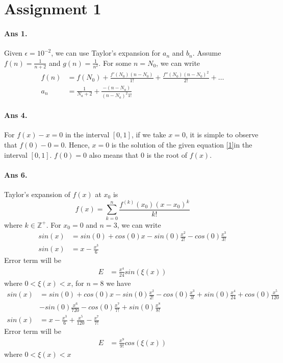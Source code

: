 \documentclass[12pt]{report}
\title{
\author{Devansh Tripathi\\ IMS22090\\ Lecturer: Dr. Asha K. Dond}
}
\begin{document}
\maketitle
\section*{Assignment 1}
\paragraph*{Ans 1.} Given $\epsilon = 10^{-2}$, we can use Taylor's expansion for $a_n$ and $b_n$. Assume $f(n) = \frac{1}{n+2}$ and $g(n) = \frac{1}{n^2}$. For some $n = N_0$, we can write
\begin{align*}
    f(n) &= f(N_0) + \frac{f'(N_0)(n-N_0)}{1!} + \frac{f''(N_0)(n-N_0)^2}{2!} + \dots\\
    a_n &= \frac{1}{N_a + 2} + \frac{-(n-N_a)}{(n-N_a)^2 1!} 
\end{align*}

\paragraph*{Ans 4.} For $f(x) - x = 0 \label{1}$ in the interval $[0,1]$, if we take $ x= 0$, it is simple to observe that $ f(0) - 0 = 0$. Hence, $x= 0$ is the solution of the given equation \ref{1}in the interval $[0,1]$. $f(0) = 0$ also means that $0$ is the root of $f(x)$. 

\paragraph*{Ans 6.} Taylor's expansion of $f(x)$ at $x_0$ is
$$ f(x) =  \sum\limits_{k=0}^{n} \frac{f^{(k)}(x_0) (x - x_0)^k}{k!} 
$$ where $k \in \mathbb{Z^+}$. For $x_0 = 0$ and $n=3$, we can write
\begin{align*}
    sin(x) &= sin(0) + cos(0)x - sin(0) \frac{x^2}{2!} - cos(0)\frac{x^3}{3!}\\
    sin(x) &= x - \frac{x^3}{6}
\end{align*}
Error term will be 
\begin{align*}
    E &= \frac{x^4}{24}sin(\xi(x))
\end{align*}
where $0 < \xi(x) < x$, for $n = 8$ we have
\begin{align*}
    sin(x) &= sin(0) + cos(0)x - sin(0) \frac{x^2}{2!} - cos(0)\frac{x^3}{3!} + sin(0) \frac{x^4}{24} + cos(0)\frac{x^5}{120} \\ &- sin(0)\frac{x^6}{720} - cos(0)\frac{x^7}{7!} + sin(0)\frac{x^8}{8!}\\
    sin(x) &= x - \frac{x^3}{6} + \frac{x^5}{120} - \frac{x^7}{7!}
\end{align*}
Error term will be
\begin{align*}
    E &= \frac{x^9}{9!}cos(\xi(x))
\end{align*}
where $0 < \xi(x) < x$
\end{document}
